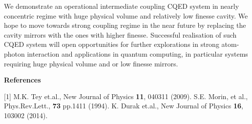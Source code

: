 \documentclass[portrait,a0,final]{a0poster} %
\newenvironment{poster}{
  \begin{center}
  \begin{minipage}[c]{0.98\textwidth}
}{
  \end{minipage} 
  \end{center}
}
\begin{document}
\begin{poster}
\begin{multicols}{2}
We demonstrate an operational intermediate coupling CQED system in nearly concentric regime with huge physical volume and relatively low finesse cavity. We hope to move towards strong coupling regime in the near future by replacing the cavity mirrors with the ones with higher finesse. Successful realisation of such CQED system will open opportunities for further explorations in strong atom-photon interaction and applications in quantum computing, in particular systems requiring huge physical volume and or low finesse mirrors.

\begin{flushleft}
       \begin{center}{\bf \large \textsf {References}}\end{center}
       [1] M.K. Tey et.al., New Journal of Physics {\textbf{11}}, 040311 (2009).
	     \newline
       [2] S.E. Morin, et al., Phys.Rev.Lett., {\textbf {73}} pp.1411 (1994).
       \newline
	     [3] K. Durak et.al., New Journal of Physics {\textbf{16}}, 103002 (2014).

\end{flushleft}
    
\end{multicols}

\end{poster}
\end{document}
